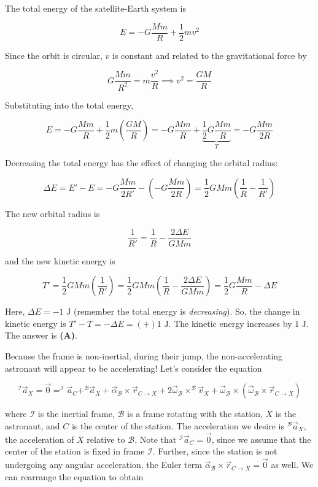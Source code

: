 \documentclass[12pt]{article}
\begin{document}
\vspace{2 \baselineskip}



The total energy of the satellite-Earth system is

$$E = -G \frac{M m}{R} + \frac{1}{2} m v^2$$

Since the orbit is circular, $v$ is constant and related to the gravitational force by

$$G \frac{M m}{R^2} = m \frac{v^2}{R} \implies v^2 = \frac{G M}{R}$$

Substituting into the total energy,

$$E = -G \frac{M m}{R} + \frac{1}{2} m \left( \frac{G M}{R} \right) = -G \frac{M m}{R} + \underbrace{\frac{1}{2} G \frac{M m}{R}}_{T} = -G \frac{M m}{2 R}$$

Decreasing the total energy has the effect of changing the orbital radius:

$$\Delta E = E' - E = -G \frac{M m}{2 R'} - \left( -G \frac{M m}{2 R} \right) = \frac{1}{2} G M m \left( \frac{1}{R} - \frac{1}{R'} \right)$$

The new orbital radius is

$$\frac{1}{R'} = \frac{1}{R} - \frac{2 \Delta E}{G M m}$$

and the new kinetic energy is

$$T' = \frac{1}{2} G M m \left( \frac{1}{R'} \right) = \frac{1}{2} G M m \left( \frac{1}{R} - \frac{2 \Delta E}{G M m} \right) = \frac{1}{2} G \frac{M m}{R} - \Delta E$$

Here, $\Delta E = -1 \text{ J}$ (remember the total energy is \textit{decreasing}). So, the change in kinetic energy is $T' - T = -\Delta E = (+) 1 \text{ J}$. The kinetic energy increases by $1 \text{ J}$. The answer is \textbf{(A)}.


\vspace{2 \baselineskip}



Because the frame is non-inertial, during their jump, the non-accelerating astronaut will appear to be accelerating! Let's consider the equation

$$^\mathcal{I} \vec{a}_X = \vec{0} = ^\mathcal{I} \vec{a}_C + ^\mathcal{B} \vec{a}_X + \vec{\alpha}_\mathcal{B} \times \vec{r}_{C \to X} + 2 \vec{\omega}_\mathcal{B} \times ^\mathcal{B} \vec{v}_X + \vec{\omega}_\mathcal{B} \times (\vec{\omega}_\mathcal{B} \times \vec{r}_{C \to X})$$

where $\mathcal{I}$ is the inertial frame, $\mathcal{B}$ is a frame rotating with the station, $X$ is the astronaut, and $C$ is the center of the station. The acceleration we desire is $^\mathcal{B} \vec{a}_X$, the acceleration of $X$ relative to $\mathcal{B}$. Note that $^\mathcal{I} \vec{a}_C = \vec{0}$, since we assume that the center of the station is fixed in frame $\mathcal{I}$. Further, since the station is not undergoing any angular acceleration, the Euler term $\vec{\alpha}_\mathcal{B} \times \vec{r}_{C \to X} = \vec{0}$ as well. We can rearrange the equation to obtain
\end{document}
